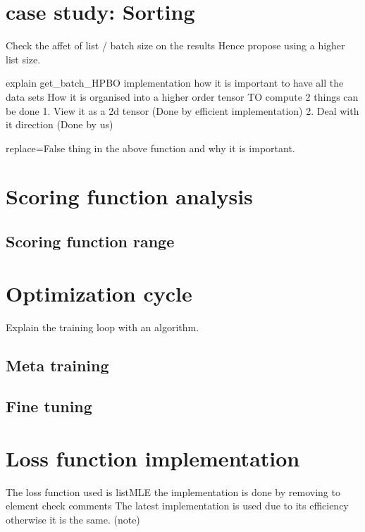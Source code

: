 \documentclass[11pt]{report}
\begin{document}
\section{case study: Sorting}

Check the affet of list / batch size on the results
Hence propose using a higher list size.

    
explain get\_batch\_HPBO implementation how it is important to have all the data sets
How it is organised into a higher order tensor
TO compute 2 things can be done
  1. View it as a 2d tensor (Done by efficient implementation)
     2. Deal with it direction (Done by us)

replace=False thing in the above function and why it is important.



\section{Scoring function analysis}
\subsection{Scoring function range}

\section{Optimization cycle}
Explain the training loop with an algorithm.
\subsection{Meta training}
\subsection{Fine tuning}

\section{Loss function implementation}
The loss function used is listMLE
the implementation is done by removing to element check comments
The latest implementation is used due to its efficiency otherwise it is the same. (note)
\end{document}
